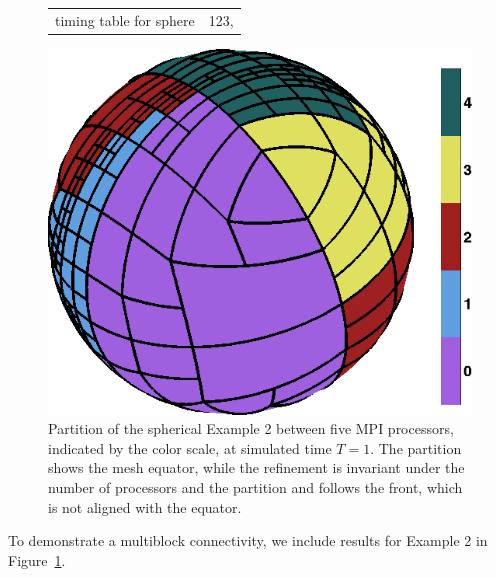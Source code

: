 \documentclass{IOS-Book-Article}     %
\newcommand{\forestclaw}{ForestClaw\xspace}
\newcommand{\pforest}{\texttt{p4est}\xspace}
\newcommand{\Fig}[1]{Figure~\ref{fig:#1}}
\begin{document}
\begin{figure}
  \begin{center}
  \begin{minipage}{.4\columnwidth}
    \begin{tabular}{cc}
      timing table for sphere & 123, \\
    \end{tabular}
  \end{minipage}
  \hspace{.05\columnwidth}
  \includegraphics[width=.4\columnwidth]{../figs_misc/sphere_partition5}
\end{center}
\caption{Partition of the spherical Example 2 between five MPI processors, indicated
  by the color scale, at simulated time $T = 1$.  The partition shows the mesh equator,
  while the refinement is invariant under the number of processors and the partition
and follows the front, which is not aligned with the equator.}
\label{fig:spherical}
\end{figure}
To demonstrate a multiblock connectivity, we include results for Example 2 in
\Fig{spherical}.














%
\end{document}
